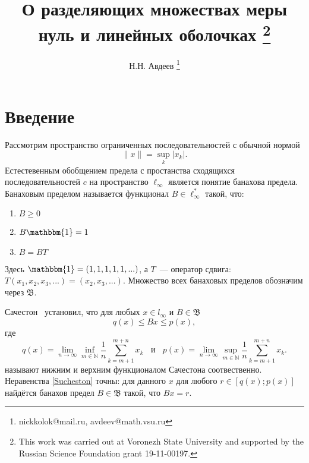 \documentclass[a4paper,14pt]{article} %
\theoremstyle{plain}
\begin{document}

\title{
	О разделяющих множествах меры нуль и линейных оболочках
	\footnote{
		This work was carried out at Voronezh State University and supported by the Russian Science
		Foundation grant 19-11-00197.
	}
}

\author{
	Н.Н. Авдеев
	\footnote{nickkolok@mail.ru, avdeev@math.vsu.ru}
}

\maketitle

\section{Введение}

Рассмотрим пространство ограниченных последовательностей с обычной нормой
\begin{equation*}
	\|x\| = \sup_{k} |x_k|
	.
\end{equation*}
Естестевенным обобщением предела с простанства сходящихся последовательностей $c$ на пространство $\ell_\infty$
является понятие банахова предела.
Банаховым пределом называется функционал $B\in \ell_\infty^*$ такой, что:
\begin{enumerate}
	\item
		$B \geqslant 0$
	\item
		$B\mathbbm{1} = 1$
	\item
		$B=BT$
\end{enumerate}
Здесь $\mathbbm{1}=(1,1,1,1,1,...)$,
а $T$~--- оператор сдвига: $T(x_1, x_2, x_3, ...) = (x_2, x_3, ...)$.
Множество всех банаховых пределов обозначим через $\mathfrak{B}$.

Сачестон~\cite{sucheston1967banach} установил, что
для любых $x\in l_\infty$ и $B\in\mathfrak{B}$
\begin{equation}\label{Sucheston}
	q(x) \leqslant Bx \leqslant p(x)
	,
\end{equation}
где
\begin{equation*}
	q(x) = \lim_{n\to\infty} \inf_{m\in\mathbb{N}}  \frac{1}{n} \sum_{k=m+1}^{m+n} x_k
	~~~~\mbox{и}~~~~
	p(x) = \lim_{n\to\infty} \sup_{m\in\mathbb{N}}  \frac{1}{n} \sum_{k=m+1}^{m+n} x_k
	.
\end{equation*}
называют нижним и верхним функционалом Сачестона соотвественно.
Неравенства \eqref{Sucheston} точны:
для данного $x$ для любого $r\in[q(x); p(x)]$ найдётся банахов предел
$B\in\mathfrak{B}$ такой, что $Bx = r$.
\end{document}

